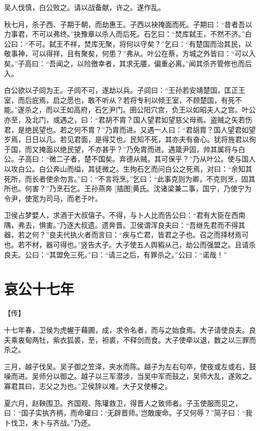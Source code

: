 \documentclass[a4paper,12pt,UTF8,twoside]{ctexbook}
\begin{document}
吴人伐慎，白公败之。请以战备献，许之。遂作乱。

秋七月，杀子西、子期于朝，而劫惠王。子西以袂掩面而死。子期曰：“昔者吾以力事君，不可以弗终。”抉豫章以杀人而后死。石乞曰：“焚库弑王，不然不济。”白公曰：“不可。弑王不祥，焚库无聚，将何以守矣？”乞曰：“有楚国而治其民，以敬事神，可以得祥，且有聚矣，何患？”弗从。叶公在蔡，方城之外皆曰：“可以入矣。”子高曰：“吾闻之，以险徼幸者，其求无餍，偏重必离。”闻其杀齐管修也而后入。

白公欲以子闾为王。子闾不可，遂劫以兵。子闾曰：“王孙若安靖楚国，匡正王室，而后庇焉，启之愿也，敢不听从？若将专利以倾王室，不顾楚国，有死不能。”遂杀之，而以王如高府，石乞尹门。圉公阳穴宫，负王以如昭夫人之宫。叶公亦至，及北门，或遇之，曰：“君胡不胄？国人望君如望慈父母焉。盗贼之矢若伤君，是绝民望也。若之何不胄？”乃胄而进。又遇一人曰：“君胡胄？国人望君如望岁焉，日日以几。若见君面，是得艾也。民知不死，其亦夫有奋心。犹将旌君以徇于国，而又掩面以绝民望，不亦甚乎？”乃免胄而进。遇箴尹固，帅其属将与白公。子高曰：“微二子者，楚不国矣。弃德从贼，其可保乎？”乃从叶公。使与国人以攻白公。白公奔山而缢，其徒微之。生拘石乞而问白公之死焉，对曰：“余知其死所，而长者使余勿言。”曰：“不言将烹。”乞曰：“此事克则为卿，不克则烹，固其所也。何害？”乃烹石乞。王孙燕奔 [插图]黄氏。沈诸梁兼二事，国宁，乃使宁为令尹，使宽为司马，而老于叶。

卫侯占梦嬖人，求酒于大叔僖子。不得，与卜人比而告公曰：“君有大臣在西南隅，弗去，惧害。”乃逐大叔遗。遗奔晋。卫侯谓浑良夫曰：“吾继先君而不得其器，若之何？”良夫代执火者而言曰：“疾与亡君，皆君之子也。召之而择材焉可也。若不材，器可得也。”竖告大子。大子使五人舆豭从己，劫公而强盟之。且请杀良夫。公曰：“其盟免三死。”曰：“请三之后，有罪杀之。”公曰：“诺哉！”


\chapter{哀公十七年}



【传】

十七年春，卫侯为虎幄于藉圃，成，求令名者，而与之始食焉。大子请使良夫。良夫乘衷甸两牡，紫衣狐裘，至，袒裘，不释剑而食。大子使牵以退，数之以三罪而杀之。

三月，越子伐吴。吴子御之笠泽，夹水而陈。越子为左右句卒，使夜或左或右，鼓噪而进。吴师分以御之。越子以三军潜涉，当吴中军而鼓之，吴师大乱，遂败之。寡君其曰，志父之为也。”卫侯辞以难。大子又使椓之。

夏六月，赵鞅围卫。齐国观、陈瓘救卫，得晋人之致师者。子玉使服而见之，曰：“国子实执齐柄，而命瓘曰：‘无辟晋师。’岂敢废命。子又何辱？”简子曰：“我卜伐卫，未卜与齐战。”乃还。
\end{document}
